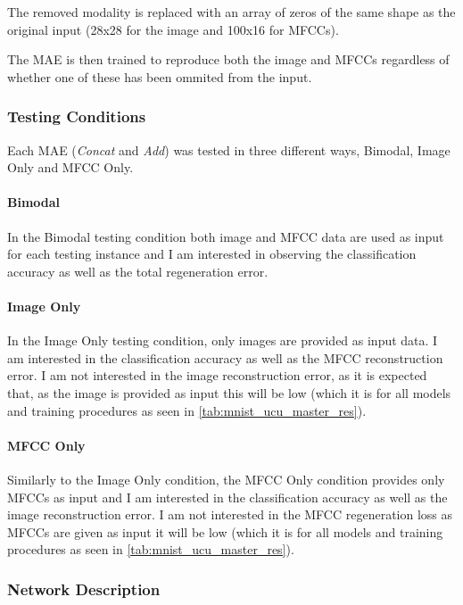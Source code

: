 The removed modality is replaced with an array of zeros of the same shape as the original input (28x28 for the image and 100x16 for \acp{MFCC}).

The \ac{MAE} is then trained to reproduce both the image and \acp{MFCC} regardless of whether one of these has been ommited from the input.

\subsubsection{Testing Conditions}
Each \ac{MAE} (\textit{Concat} and \textit{Add}) was tested in three different ways, Bimodal, Image Only and \ac{MFCC} Only.

\paragraph{Bimodal}
In the Bimodal testing condition both image and \ac{MFCC} data are used as input for each testing instance and I am interested in observing the classification accuracy as well as the total regeneration error.

\paragraph{Image Only}
In the Image Only testing condition, only images are provided as input data. I am interested in the classification accuracy as well as the \ac{MFCC} reconstruction error. I am not interested in the image reconstruction error, as it is expected that, as the image is provided as input this will be low (which it is for all models and training procedures as seen in \autoref{tab:mnist_ucu_master_res}).  

\paragraph{\ac{MFCC} Only}
Similarly to the Image Only condition, the \ac{MFCC} Only condition provides only \acp{MFCC} as input and I am interested in the classification accuracy as well as the image reconstruction error. I am not interested in the \ac{MFCC} regeneration loss as \acp{MFCC} are given as input it will be low (which it is for all models and training procedures as seen in \autoref{tab:mnist_ucu_master_res}).  

\subsubsection{Network Description}
